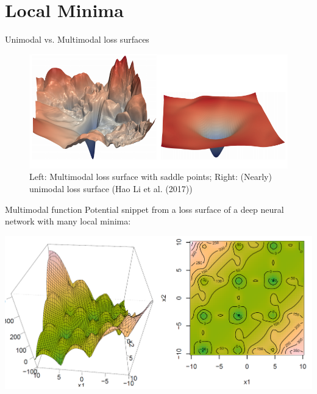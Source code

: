\section{Local Minima}

\begin{vbframe}{Unimodal vs. Multimodal loss surfaces}
  \begin{figure}
  \centering
    \includegraphics[width=12cm]{plots/difficult_vs_easy.png}
    \caption{Left: Multimodal loss surface with saddle points; Right: (Nearly) unimodal loss surface (Hao Li et al. (2017))}
  \end{figure}
\end{vbframe}


\begin{vbframe}{Multimodal function}
Potential snippet from a loss surface of a deep neural network with many local minima:

\begin{center}
  \includegraphics[width=.9\textwidth]{plots/multimodal.png}
\end{center}

\end{vbframe}

